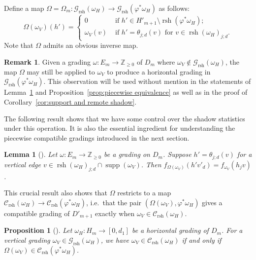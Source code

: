 \documentclass[10pt]{amsart}
\newtheorem{lemma}[theorem]{Lemma}
\newtheorem{proposition}[theorem]{Proposition}
\theoremstyle{definition}
\newtheorem{remark}[theorem]{Remark}
\newcommand{\ie}{i.e.\ }
\newcommand{\cC}{\mathcal{C}}
\newcommand{\cG}{\mathcal{G}}
\newcommand{\ZZ}{\mathbb{Z}}
\DeclareMathOperator{\supp}{supp}
\DeclareMathOperator{\rsh}{rsh}
\begin{document}
Define a map $\Omega=\Omega_m:\cG_{\rsh}(\omega_H)\to\cG_{\rsh}(\varphi^*\omega_H)$ as follows:
\[\Omega(\omega_V)(h')=
 \begin{cases}
 0 & \text{ if $h'\in H'_{m+1}\setminus\rsh(\varphi^*\omega_H)$;}\\
 \omega_V(v) & \text{ if $h'=\theta_{j;d}(v)$ for $v\in\rsh(\omega_H)_{j;d}$.}
 \end{cases}\]
Note that $\Omega$ admits an obvious inverse map. 
\begin{remark}
 Given a grading $\omega:E_m\to\ZZ_{\ge0}$ of $D_m$ where $\omega_V\notin\cG_{\rsh}(\omega_H)$, the map $\Omega$ may still be applied to $\omega_V$ to produce a horizontal grading in $\cG_{\rsh}(\varphi^*\omega_H)$. 
 This observation will be used without mention in the statements of Lemma~\ref{le:f_and_Omega} and Proposition~\ref{prop:piecewise equivalence} as well as in the proof of Corollary~\ref{cor:support and remote shadow}.
\end{remark}

The following result shows that we have some control over the shadow statistics under this operation.
It is also the essential ingredient for understanding the piecewise compatible gradings introduced in the next section.
\begin{lemma}[{\cite[Lemma~4.19]{rupel2}}]
 \label{le:f_and_Omega}
 Let $\omega:E_m\to\ZZ_{\ge0}$ be a grading on $D_m$.
 Suppose $h'=\theta_{j;d}(v)$ for a vertical edge $v\in\rsh(\omega_H)_{j;d}\cap\supp(\omega_V)$. Then $f_{\Omega(\omega_V)}(h'v'_d)=f_{\omega_V}(h_jv)$.
\end{lemma}
This crucial result also shows that $\Omega$ restricts to a map $\cC_{\rsh}(\omega_H)\to\cC_{\rsh}(\varphi^*\omega_H)$, \ie that the pair $(\Omega(\omega_V),\varphi^*\omega_H)$ gives a compatible grading of $D'_{m+1}$ exactly when $\omega_V\in\cC_{\rsh}(\omega_H)$.
\begin{proposition}[{\cite[Lemma~4.20]{rupel2}}]
 \label{prop:compatibility equivalence}
 Let $\omega_H:H_m\to[0,d_1]$ be a horizontal grading of $D_m$. 
 For a vertical grading $\omega_V\in\cG_{\rsh}(\omega_H)$, we have $\omega_V\in\cC_{\rsh}(\omega_H)$ if and only if $\Omega(\omega_V)\in\cC_{\rsh}(\varphi^*\omega_H)$.
\end{proposition}
\end{document}
